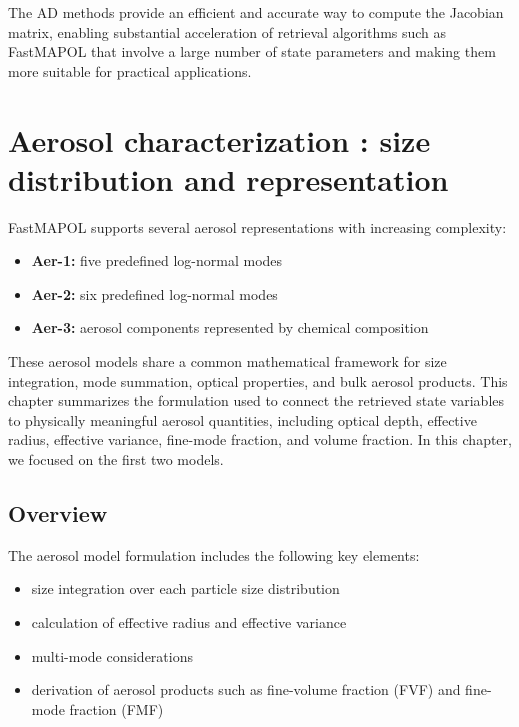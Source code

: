 \documentclass[
  11pt,
  letterpaper,
  DIV=11,
  numbers=noendperiod]{scrreprt}
\providecommand{\tightlist}{%
  \setlength{\itemsep}{0pt}\setlength{\parskip}{0pt}}
\begin{document}
The AD methods provide an efficient and accurate way to compute the
Jacobian matrix, enabling substantial acceleration of retrieval
algorithms such as FastMAPOL that involve a large number of state
parameters and making them more suitable for practical applications.

\chapter{Aerosol characterization : size distribution and
representation}\label{aerosol-characterization-size-distribution-and-representation}

FastMAPOL supports several aerosol representations with increasing
complexity:

\begin{itemize}
\tightlist
\item
  \textbf{Aer-1:} five predefined log-normal modes
\item
  \textbf{Aer-2:} six predefined log-normal modes
\item
  \textbf{Aer-3:} aerosol components represented by chemical composition
\end{itemize}

These aerosol models share a common mathematical framework for size
integration, mode summation, optical properties, and bulk aerosol
products. This chapter summarizes the formulation used to connect the
retrieved state variables to physically meaningful aerosol quantities,
including optical depth, effective radius, effective variance, fine-mode
fraction, and volume fraction. In this chapter, we focused on the first
two models.

\section{Overview}\label{overview-2}

The aerosol model formulation includes the following key elements:

\begin{itemize}
\tightlist
\item
  size integration over each particle size distribution
\item
  calculation of effective radius and effective variance
\item
  multi-mode considerations
\item
  derivation of aerosol products such as fine-volume fraction (FVF) and
  fine-mode fraction (FMF)
\end{itemize}
\end{document}
